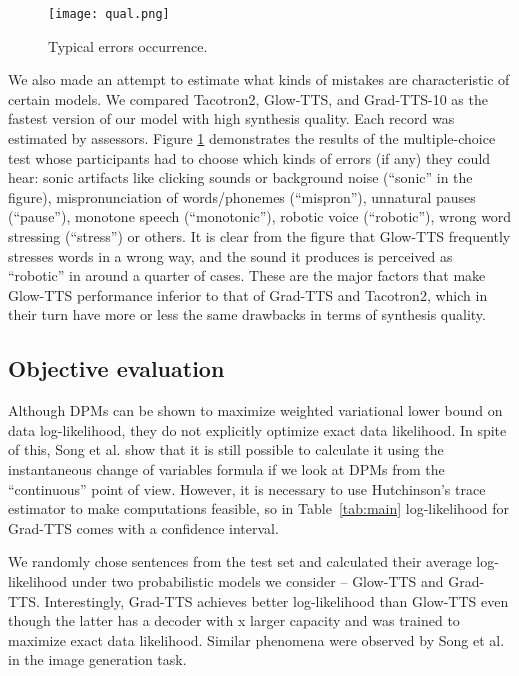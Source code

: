 \documentclass{article}
\begin{document}
\begin{figure}[ht]
\vskip 0.1in
\begin{center}
\centerline{\texttt{[image: qual.png]}}
\caption{Typical errors occurrence.}
\label{fig:qualitative}
\end{center}
\vskip -0.1in
\end{figure}

We also made an attempt to estimate what kinds of mistakes are characteristic of certain models. We compared Tacotron2, Glow-TTS, and Grad-TTS-10 as the fastest version of our model with high synthesis quality. Each record was estimated by  assessors. Figure \ref{fig:qualitative} demonstrates the results of the multiple-choice test whose participants had to choose which kinds of errors (if any) they could hear: sonic artifacts like clicking sounds or background noise (``sonic'' in the figure), mispronunciation of words/phonemes (``mispron''), unnatural pauses (``pause''), monotone speech (``monotonic''), robotic voice (``robotic''), wrong word stressing (``stress'') or others. It is clear from the figure that Glow-TTS frequently stresses words in a wrong way, and the sound it produces is perceived as ``robotic'' in around a quarter of cases. These are the major factors that make Glow-TTS performance inferior to that of Grad-TTS and Tacotron2, which in their turn have more or less the same drawbacks in terms of synthesis quality.

\subsection{Objective evaluation}
\label{subsec:obj}
Although DPMs can be shown to maximize weighted variational lower bound \cite{DDPM} on data log-likelihood, they do not explicitly optimize exact data likelihood. In spite of this, Song et al.  show that it is still possible to calculate it using the instantaneous change of variables formula \cite{NODE} if we look at DPMs from the ``continuous'' point of view. However, it is necessary to use Hutchinson's trace estimator to make computations feasible, so in Table~\ref{tab:main} log-likelihood for Grad-TTS comes with a  confidence interval.

We randomly chose  sentences from the test set and calculated their average log-likelihood under two probabilistic models we consider -- Glow-TTS and Grad-TTS. Interestingly, Grad-TTS achieves better log-likelihood than Glow-TTS even though the latter has a decoder with x larger capacity and was trained to maximize exact data likelihood. Similar phenomena were observed by Song et al.  in the image generation task.
\end{document}
